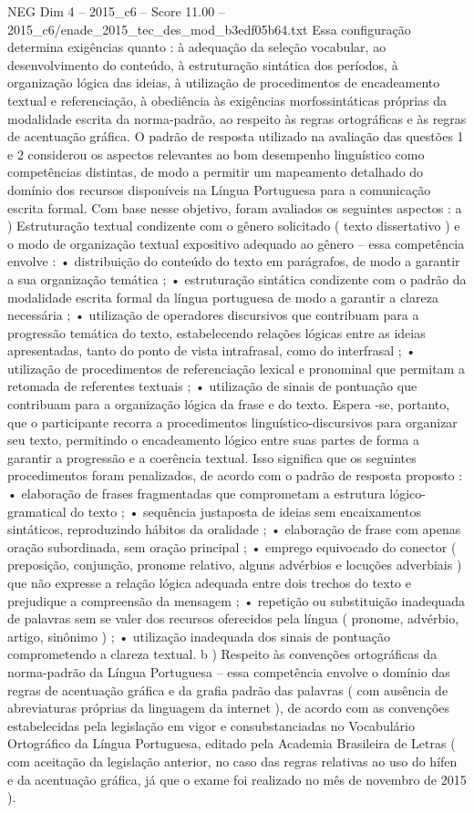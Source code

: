 \begin{textsample}{NEG Dim 4 – 2015\_c6 – Score 11.00 – 2015\_c6/enade\_2015\_tec\_des\_mod\_b3edf05b64.txt}
Essa configuração determina exigências quanto : à adequação da seleção vocabular, ao desenvolvimento do conteúdo, à estruturação sintática dos períodos, à organização lógica das ideias, à utilização de procedimentos de encadeamento textual e referenciação, à obediência às exigências morfossintáticas próprias da modalidade escrita da norma-padrão, ao respeito às regras ortográficas e às regras de acentuação gráfica.
O padrão de resposta utilizado na avaliação das questões 1 e 2 considerou os aspectos relevantes ao bom desempenho linguístico como competências distintas, de modo a permitir um mapeamento detalhado do domínio dos recursos disponíveis na Língua Portuguesa para a comunicação escrita formal.
Com base nesse objetivo, foram avaliados os seguintes aspectos : a ) Estruturação textual condizente com o gênero solicitado ( texto dissertativo ) e o modo de organização textual expositivo adequado ao gênero – essa competência envolve : • distribuição do conteúdo do texto em parágrafos, de modo a garantir a sua organização temática ; • estruturação sintática condizente com o padrão da modalidade escrita formal da língua portuguesa de modo a garantir a clareza necessária ; • utilização de operadores discursivos que contribuam para a progressão temática do texto, estabelecendo relações lógicas entre as ideias apresentadas, tanto do ponto de vista intrafrasal, como do interfrasal ; • utilização de procedimentos de referenciação lexical e pronominal que permitam a retomada de referentes textuais ; • utilização de sinais de pontuação que contribuam para a organização lógica da frase e do texto.
Espera -se, portanto, que o participante recorra a procedimentos linguístico-discursivos para organizar seu texto, permitindo o encadeamento lógico entre suas partes de forma a garantir a progressão e a coerência textual.
Isso significa que os seguintes procedimentos foram penalizados, de acordo com o padrão de resposta proposto : • elaboração de frases fragmentadas que comprometam a estrutura lógico-gramatical do texto ; • sequência justaposta de ideias sem encaixamentos sintáticos, reproduzindo hábitos da oralidade ; • elaboração de frase com apenas oração subordinada, sem oração principal ; • emprego equivocado do conector ( preposição, conjunção, pronome relativo, alguns advérbios e locuções adverbiais ) que não expresse a relação lógica adequada entre dois trechos do texto e prejudique a compreensão da mensagem ; • repetição ou substituição inadequada de palavras sem se valer dos recursos oferecidos pela língua ( pronome, advérbio, artigo, sinônimo ) ; • utilização inadequada dos sinais de pontuação comprometendo a clareza textual. b ) Respeito às convenções ortográficas da norma-padrão da Língua Portuguesa – essa competência envolve o domínio das regras de acentuação gráfica e da grafia padrão das palavras ( com ausência de abreviaturas próprias da linguagem da internet ), de acordo com as convenções estabelecidas pela legislação em vigor e consubstanciadas no Vocabulário Ortográfico da Língua Portuguesa, editado pela Academia Brasileira de Letras ( com aceitação da legislação anterior, no caso das regras relativas ao uso do hífen e da acentuação gráfica, já que o exame foi realizado no mês de novembro de 2015 ).

\end{textsample}
